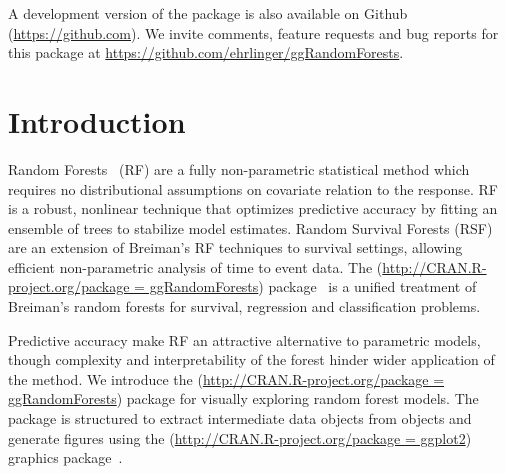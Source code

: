 \documentclass[nojss]{jss}\usepackage[]{graphicx}\usepackage[]{color}
\begin{document}
A development version of the  package is also available on Github (\url{https://github.com}). We invite comments, feature requests and bug reports for this package at \url{https://github.com/ehrlinger/ggRandomForests}.

\section{Introduction} \label{S:introduction}

Random Forests~\citep{Breiman:2001} (RF) are a fully non-parametric statistical method which requires no distributional assumptions on covariate relation to the response. RF is a robust, nonlinear technique that optimizes predictive accuracy by fitting an ensemble of trees to stabilize model estimates. Random Survival Forests (RSF)~\citep{Ishwaran:2007a,Ishwaran:2008} are an extension of Breiman's RF techniques to survival settings, allowing efficient non-parametric analysis of time to event data. The  (\url{http://CRAN.R-project.org/package = ggRandomForests}) package~\citep{Ishwaran:RFSRC:2014} is a unified treatment of Breiman's random forests for survival, regression and classification problems.

Predictive accuracy make RF an attractive alternative to parametric models, though complexity and interpretability of the forest hinder wider application of the method. We introduce the  (\url{http://CRAN.R-project.org/package = ggRandomForests}) package for visually exploring random forest models. The  package is structured to extract intermediate data objects from  objects and generate figures using the  (\url{http://CRAN.R-project.org/package = ggplot2}) graphics package~\citep{Wickham:2009}.
\end{document}

